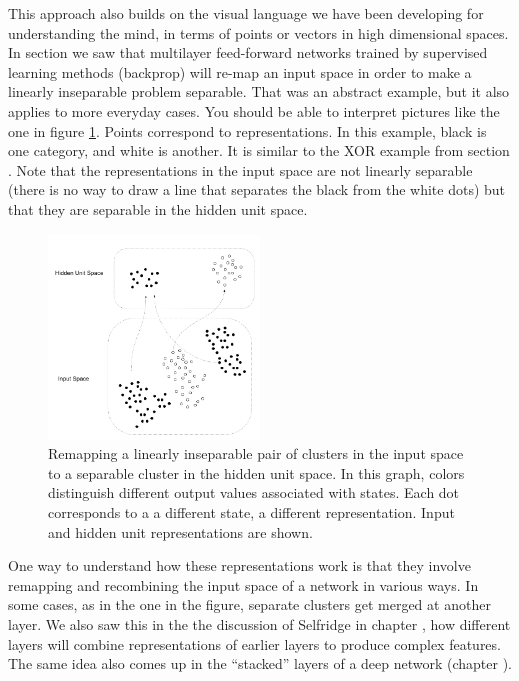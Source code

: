 This approach also builds on the visual language we have been developing for understanding the mind, in terms of points or vectors in high dimensional spaces. In section  we saw that multilayer feed-forward networks trained by supervised learning methods (\eg backprop) will re-map an input space in order to make a linearly inseparable problem separable. That was an abstract example, but it also applies to more everyday cases. You should be able to interpret pictures like the one in figure \ref{remappingClusters}.  Points correspond to representations. In this example, black is one category, and white is another. It is similar to the XOR example from section .  Note that the representations in the input space are not linearly separable (there is no way to draw a line that separates the black from the white dots) but that they are separable in the hidden unit space.
\begin{figure}[h]
\centering
\includegraphics[width=0.5\textwidth]{images/remappingClusters}
\caption[Jeff Yoshimi.]{Remapping a linearly inseparable pair of clusters in the input space to a separable cluster in the hidden unit space. In this graph, colors distinguish different output values associated with states. Each dot corresponds to a a different state, a different representation. Input and hidden unit representations are shown.}
\label{remappingClusters}
\end{figure}

One way to understand how these representations work is that they involve remapping and recombining the input space of a network in various ways. In some cases, as in the one in the figure, separate clusters get merged at another layer.  We also saw this in the the discussion of Selfridge in chapter , how different layers will combine representations of earlier layers to produce complex features. The same idea also comes up in the ``stacked'' layers of a deep network (chapter ). 

